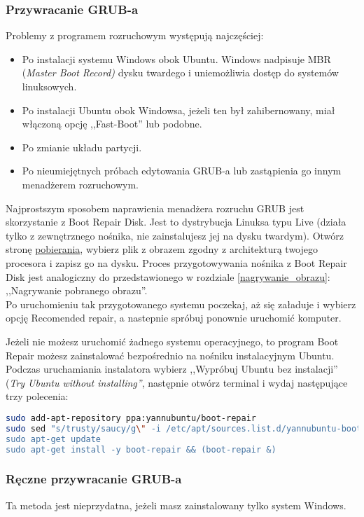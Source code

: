 \subsubsection{Przywracanie GRUB-a}
\label{grub_przywracanie}
Problemy z programem rozruchowym występują najczęściej:
\begin{itemize}
\item Po instalacji systemu Windows obok Ubuntu. Windows nadpisuje MBR (\textit{Master Boot Record)} dysku twardego i uniemożliwia dostęp do systemów linuksowych.
\item Po instalacji Ubuntu obok Windowsa, jeżeli ten był zahibernowany, miał włączoną opcję ,,Fast-Boot'' lub podobne.
\item Po zmianie układu partycji.
\item Po nieumiejętnych próbach edytowania GRUB-a lub zastąpienia go innym menadżerem rozruchowym.
\end{itemize}

Najprostszym sposobem naprawienia menadżera rozruchu GRUB jest skorzystanie z Boot Repair Disk. Jest to dystrybucja Linuksa typu Live (działa tylko z zewnętrznego nośnika, nie zainstalujesz jej na dysku twardym). Otwórz stronę \href{http://sourceforge.net/projects/boot-repair-cd/files/}{pobierania}, wybierz plik z obrazem zgodny z architekturą twojego procesora i zapisz go na dysku. Proces przygotowywania nośnika z Boot Repair Disk jest analogiczny do przedstawionego w rozdziale \ref{nagrywanie_obrazu}: ,,Nagrywanie pobranego obrazu''.\\
Po uruchomieniu tak przygotowanego systemu poczekaj, aż się załaduje i wybierz opcję \textcolor{ubuntu_orange}{Recomended repair}, a nastepnie spróbuj ponownie uruchomić komputer.

Jeżeli nie możesz uruchomić żadnego systemu operacyjnego, to program Boot Repair możesz zainstalować bezpośrednio na nośniku instalacyjnym Ubuntu. Podczas uruchamiania instalatora wybierz ,,Wypróbuj Ubuntu bez instalacji'' (\textit{Try Ubuntu without installing''}, następnie otwórz terminal  i wydaj następujące trzy polecenia:

\begin{lstlisting}[language=bash]
sudo add-apt-repository ppa:yannubuntu/boot-repair
sudo sed "s/trusty/saucy/g\" -i /etc/apt/sources.list.d/yannubuntu-boot-repair-trusty.list
sudo apt-get update
sudo apt-get install -y boot-repair && (boot-repair &)
\end{lstlisting}

\subsubsection{Ręczne przywracanie GRUB-a}
Ta metoda jest nieprzydatna, jeżeli masz zainstalowany tylko system Windows.

